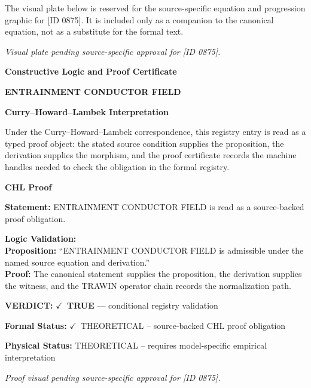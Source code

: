 \begingroup\footnotesize\sloppy
The visual plate below is reserved for the source-specific equation and progression graphic for [ID 0875]. It is included only as a companion to the canonical equation, not as a substitute for the formal text.
\par\endgroup
\begingroup\footnotesize\itshape
Visual plate pending source-specific approval for [ID 0875].
\par\endgroup

\clearpage
\begingroup\tzpsupportsetup
\noindent\textbf{\fontsize{10.8pt}{12.8pt}\selectfont [ID 0875] Constructive Logic and Proof Certificate}\par
\noindent\textbf{\fontsize{10pt}{12pt}\selectfont ENTRAINMENT CONDUCTOR FIELD}\par
\vspace{0.45em}
\begingroup
\footnotesize
\setlength{\parskip}{0.22em}
\setlength{\parindent}{0pt}
\noindent\textbf{Curry--Howard--Lambek Interpretation}\par
Under the Curry--Howard--Lambek correspondence, this registry entry is read as a typed proof
object: the stated source condition supplies the proposition, the derivation supplies the
morphism, and the proof certificate records the machine handles needed to check the obligation
in the formal registry.

\vspace{0.45em}
\noindent\textbf{CHL Proof}\par
\textbf{Statement:} ENTRAINMENT CONDUCTOR FIELD is read as a source-backed proof obligation.

\textbf{Logic Validation:}\\
\textbf{Proposition:} ``ENTRAINMENT CONDUCTOR FIELD is admissible under the named source equation and derivation.''\\
\textbf{Proof:} The canonical statement supplies the proposition, the derivation supplies the witness, and the TRAWIN operator chain records the normalization path.

\textbf{VERDICT:} \ensuremath{\checkmark}\ \textbf{TRUE} --- conditional registry validation

\textbf{Formal Status:} \ensuremath{\checkmark}\ THEORETICAL -- source-backed CHL proof obligation

\textbf{Physical Status:} THEORETICAL -- requires model-specific empirical interpretation
\par\vspace{0.45em}
\par
\vfill
\begingroup\footnotesize\itshape
Proof visual pending source-specific approval for [ID 0875].
\par\endgroup
\vfill
\endgroup
\endgroup
